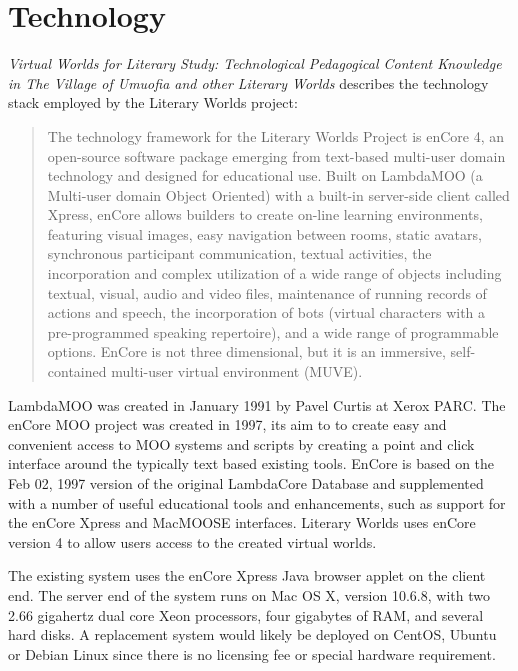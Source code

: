 \documentclass[12pt, letterpaper]{report}
\begin{document}
\section{Technology}
\par
\textit{Virtual Worlds for Literary Study: Technological Pedagogical Content Knowledge in \textit{The Village of Umuofia} and other Literary Worlds} describes the technology stack employed by the Literary Worlds project:
\begin{quotation}
The technology framework for the Literary Worlds Project is enCore 4, an open-source software package emerging from text-based multi-user domain technology and designed for educational use. Built on LambdaMOO (a Multi-user domain Object Oriented) with a built-in server-side client called Xpress, enCore allows builders to create on-line learning environments, featuring visual images, easy navigation between rooms, static avatars, synchronous participant communication, textual activities, the incorporation and complex utilization of a wide range of objects including textual, visual, audio and video files, maintenance of running records of actions and speech, the incorporation of bots (virtual characters with a pre-programmed speaking repertoire), and a wide range of programmable options.  EnCore is not three dimensional, but it is an immersive, self-contained multi-user virtual environment (MUVE). \cite{VirtWorldsTech}
\end{quotation}
\par 
LambdaMOO was created in January 1991 by Pavel Curtis at Xerox PARC.\cite{Wired}
The enCore MOO project was created in 1997, its aim to to create easy and convenient access to MOO systems and scripts by creating a point and click interface around the typically text based existing tools. EnCore is based on the Feb 02, 1997 version of the original LambdaCore Database and supplemented with a number of useful educational tools and enhancements, such as support for the enCore Xpress and MacMOOSE interfaces. Literary Worlds uses enCore version 4 to allow users access to the created virtual worlds.

\par
The existing system uses the enCore Xpress Java browser applet on the client end. The server end of the system runs on Mac OS X, version 10.6.8, with two 2.66 gigahertz dual core Xeon processors, four gigabytes of RAM, and several hard disks. A replacement system would likely be deployed on CentOS, Ubuntu or Debian Linux since there is no licensing fee or special hardware requirement.
\end{document}
